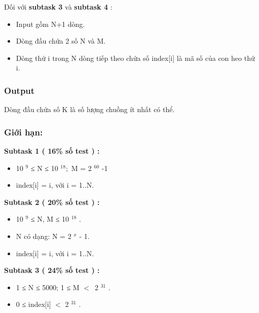 Đối với \textbf{ subtask 3 } và \textbf{ subtask 4 } :
\begin{itemize}
	\item Input gồm N+1 dòng.
	\item Dòng đầu chứa 2 số N và M.
	\item Dòng thứ i trong N dòng tiếp theo chứa số index[i] là mã số của con heo thứ i.
\end{itemize}
\begin{itemize}
\end{itemize}

\subsubsection{Output}

Dòng đầu chứa số K là số lượng chuồng ít nhất có thể.
\begin{itemize}
\end{itemize}

\subsubsection{Giới hạn:}

\textbf{Subtask 1 ( 16\% số test ) : }
\begin{itemize}
	\item 

10 $^ 9 $ ≤ N ≤ 10 $^ 18; $ M = 2 $^ 60 $ -1
	\item 

index[i] = i, với i = 1..N.
\end{itemize}

\textbf{Subtask 2 ( 20\% số test ) : }
\begin{itemize}
	\item 

10 $^ 9 $ ≤ N, M ≤ 10 $^ 18 $ .
	\item 

N có dạng: N = 2 $^ x $ - 1.
	\item 

index[i] = i, với i = 1..N.
\end{itemize}

\textbf{Subtask 3 ( 24\% số test ) : }
\begin{itemize}
	\item 

1 ≤ N ≤ 5000; 1 ≤ M $<$ 2 $^ 31 $ .
	\item 

0 ≤ index[i] $<$ 2 $^ 31 $ .
\end{itemize}

